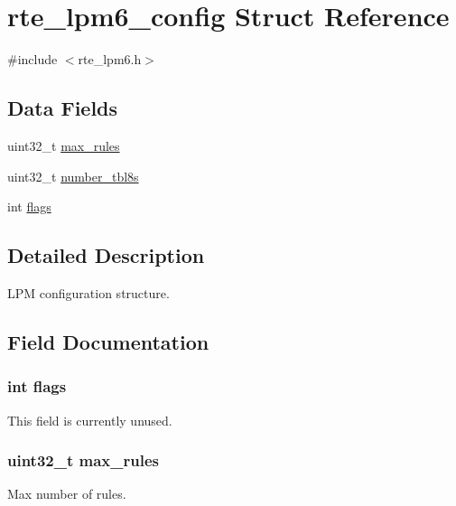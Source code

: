 \hypertarget{structrte__lpm6__config}{}\section{rte\+\_\+lpm6\+\_\+config Struct Reference}
\label{structrte__lpm6__config}


{\ttfamily \#include $<$rte\+\_\+lpm6.\+h$>$}

\subsection*{Data Fields}
\begin{DoxyCompactItemize}
\item 
uint32\+\_\+t \hyperlink{structrte__lpm6__config_a903c7df1ae388ba119070235cd2a19a8}{max\+\_\+rules}
\item 
uint32\+\_\+t \hyperlink{structrte__lpm6__config_a26b1de46eddcd0f3aae08f8a5fa7bd2d}{number\+\_\+tbl8s}
\item 
int \hyperlink{structrte__lpm6__config_ac8bf36fe0577cba66bccda3a6f7e80a4}{flags}
\end{DoxyCompactItemize}


\subsection{Detailed Description}
L\+P\+M configuration structure. 

\subsection{Field Documentation}
\hypertarget{structrte__lpm6__config_ac8bf36fe0577cba66bccda3a6f7e80a4}{}
\subsubsection[{flags}]{\setlength{\rightskip}{0pt plus 5cm}int flags}\label{structrte__lpm6__config_ac8bf36fe0577cba66bccda3a6f7e80a4}
This field is currently unused. \hypertarget{structrte__lpm6__config_a903c7df1ae388ba119070235cd2a19a8}{}
\subsubsection[{max\+\_\+rules}]{\setlength{\rightskip}{0pt plus 5cm}uint32\+\_\+t max\+\_\+rules}\label{structrte__lpm6__config_a903c7df1ae388ba119070235cd2a19a8}
Max number of rules. \hypertarget{structrte__lpm6__config_a26b1de46eddcd0f3aae08f8a5fa7bd2d}{}

